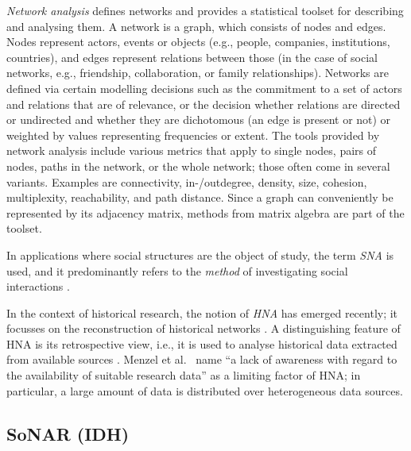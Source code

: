 \emph{Network analysis}
defines networks and provides a statistical toolset for describing and analysing them.
A network is a graph, which consists of nodes and edges.
Nodes represent actors, events or objects (e.g., people, companies, institutions, countries),
and edges represent relations between those (in the case of social networks, e.g.,
friendship, collaboration, or family relationships).
Networks are defined via certain modelling decisions
such as the commitment to a set of actors and relations that are of relevance,
or the decision whether relations are directed or undirected
and whether they are dichotomous (an edge is present or not)
or weighted by values representing frequencies or extent.
The tools provided by network analysis include
various metrics that apply to single nodes, pairs of nodes, paths in the network,
or the whole network; those often come in several variants.
Examples are connectivity, in-/outdegree, density,
size, cohesion, multiplexity, reachability, and path distance.
Since a graph can conveniently be represented by its adjacency matrix,
methods from matrix algebra are part of the toolset.

In applications where social structures are the object of study,
the term \emph{\gls{SNA}} is used,
and it predominantly refers to the \emph{method} of investigating
social interactions \autocite{Otte2002}.

In the context of historical research,
the notion of \emph{\gls{HNA}}
has emerged recently; it focusses on the reconstruction of
historical networks \autocite{Menzel2020}.
A distinguishing feature of \gls{HNA} is its retrospective view,
i.e., it is used to analyse historical data extracted
from available sources \autocite{Fangerau2022}.
Menzel et al.\ \autocite*{Menzel2020} name
\enquote{a lack of awareness with regard to the availability of suitable research data}
as a limiting factor of \gls{HNA};
in particular, a large amount of data is distributed over heterogeneous data sources.

\subsection{SoNAR (IDH)}

